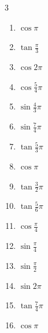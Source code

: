 \begin{multicols}{3}
\begin{enumerate}
  \item $\displaystyle \cos{\pi}$
        \phantom{$\displaystyle =-1$}

  \item $\displaystyle \tan{\frac{\pi}{3}}$

  \item $\displaystyle \cos{2\pi}$
        \phantom{$\displaystyle =1$}

\columnbreak %

  \item $\displaystyle \cos{\frac{5}{4}\pi}$

  \item $\displaystyle \sin{\frac{4}{3}\pi}$

  \item $\displaystyle \sin{\frac{7}{4}\pi}$

  \item $\displaystyle \tan{\frac{5}{3}\pi}$

  \item $\displaystyle \cos{\pi}$
        \phantom{$\displaystyle =-1$}

  \item $\displaystyle \tan{\frac{3}{2}\pi}$
        \phantom{$\displaystyle \quad なし$}

  \item $\displaystyle \tan{\frac{5}{6}\pi}$

  \item $\displaystyle \cos{\frac{\pi}{4}}$

  \item $\displaystyle \sin{\frac{\pi}{4}}$

  \item $\displaystyle \sin{\frac{\pi}{2}}$
        \phantom{$\displaystyle =1$}

  \item $\displaystyle \sin{2\pi}$
        \phantom{$\displaystyle =0$}

  \item $\displaystyle \tan{\frac{7}{4}\pi}$
        \phantom{$\displaystyle =-1$}

  \item $\displaystyle \cos{\pi}$
        \phantom{$\displaystyle =-1$}


\end{enumerate}
\end{multicols}
